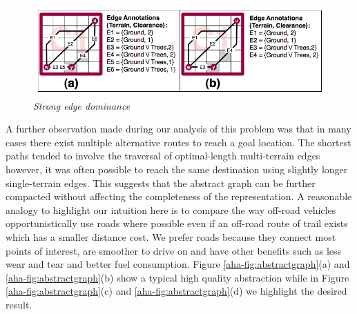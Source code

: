 \begin{figure}[htbp]
	\vspace{-12pt}
        \caption{\emph{Strong edge dominance} }
        \begin{center}
                        \includegraphics[scale=0.3, trim = 20mm 7mm 20mm 5mm]{diagrams/intraedges_initial.png}
        \end{center}
        \label{aha-fig:strongdominance}
	\vspace{-6pt}
\end{figure}
A further observation made during our analysis of this problem was that in many cases there exist multiple alternative routes to reach a goal location.
The shortest paths tended to involve the traversal of optimal-length multi-terrain edges however, it was often possible to reach the same destination using slightly longer single-terrain edges.
This suggests that the abstract graph can be further compacted without affecting the completeness of the representation.
A reasonable analogy to highlight our intuition here is to compare the way off-road vehicles opportunistically use roads where possible even if an off-road route of trail exists which has a smaller distance cost.
We prefer roads because they connect most points of interest, are smoother to drive on and have other benefits such as less wear and tear and better fuel consumption.
Figure \ref{aha-fig:abstractgraph}(a) and \ref{aha-fig:abstractgraph}(b) show a typical high quality abstraction while in Figure \ref{aha-fig:abstractgraph}(c) and \ref{aha-fig:abstractgraph}(d) we highlight the desired result. 
